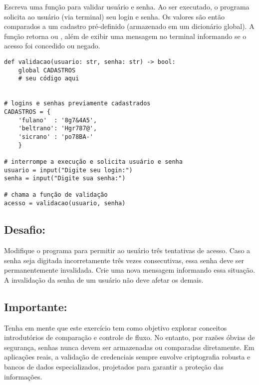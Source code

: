 Escreva uma função para validar usuário e senha.
Ao ser executado, o programa solicita ao usuário (via terminal) seu login e senha.
Os valores são então comparados a um cadastro pré-definido (armazenado em um dicionário global).
A função retorna  ou , além de exibir uma mensagem no terminal informando se o acesso foi concedido ou negado.
\begin{verbatim}
def validacao(usuario: str, senha: str) -> bool:
    global CADASTROS
    # seu código aqui


# logins e senhas previamente cadastrados
CADASTROS = {
    'fulano'  : '8g7&4A5',
    'beltrano': 'Hgr787@',
    'sicrano' : 'po78BA-'
    }

# interrompe a execução e solicita usuário e senha
usuario = input("Digite seu login:")
senha = input("Digite sua senha:")

# chama a função de validação
acesso = validacao(usuario, senha)
\end{verbatim}

\subsection*{Desafio:}
Modifique o programa para permitir ao usuário três tentativas de acesso.
Caso a senha seja digitada incorretamente três vezes consecutivas, essa senha deve ser permanentemente invalidada.
Crie uma nova mensagem informando essa situação.
A invalidação da senha de um usuário não deve afetar os demais.


\subsection*{Importante:}
Tenha em mente que este exercício tem como objetivo explorar conceitos introdutórios de comparação e controle de fluxo.
No entanto, por razões óbvias de segurança, senhas nunca devem ser armazenadas ou comparadas diretamente.
Em aplicações reais, a validação de credenciais sempre envolve criptografia robusta e bancos de dados especializados,
projetados para garantir a proteção das informações.




